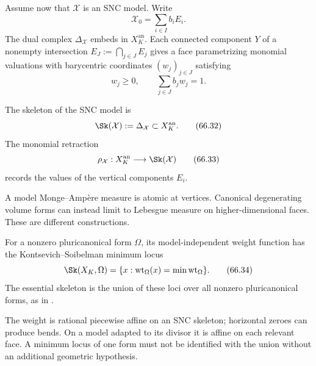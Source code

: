 Assume now that $\mathcal X$ is an SNC model. Write
\[
                         \mathcal X_0=\sum_{i\in I}b_iE_i.
\tag{66.30}\label{eq:hybrid-snc-fibre}
\]
The dual complex $\Delta_{\mathcal X}$ embeds in
$X_K^{\mathrm{an}}$. Each connected component $Y$ of a nonempty intersection
$E_J:=\bigcap_{j\in J}E_j$ gives a face parametrizing monomial valuations with barycentric coordinates $(w_j)_{j\in J}$ satisfying
\[
                         w_j\geq0,
             \qquad \sum_{j\in J}b_jw_j=1.
\tag{66.31}\label{eq:hybrid-simplex}
\]

\begin{definition}
\label{def:hybrid-skeleton}
The skeleton of the SNC model is
\[
                     \Sk(\mathcal X):=\Delta_{\mathcal X}
                     \subset X_K^{\mathrm{an}}.
\tag{66.32}\label{eq:hybrid-skeleton}
\]
The monomial retraction
\[
               \rho_{\mathcal X}:X_K^{\mathrm{an}}
                    \longrightarrow\Sk(\mathcal X)
\tag{66.33}\label{eq:hybrid-retraction}
\]
records the values of the vertical components $E_i$.
\end{definition}

A model Monge--Amp\`ere measure is atomic at vertices. Canonical
degenerating volume forms can instead limit to Lebesgue measure on
higher-dimensional faces. These are different constructions.

\begin{definition}
\label{def:hybrid-essential-skeleton}
For a nonzero pluricanonical form $\Omega$, its model-independent weight function has the Kontsevich--Soibelman minimum locus
\[
 \Sk(X_K,\Omega)=\{x:\mathrm{wt}_\Omega(x)=\min\mathrm{wt}_\Omega\}.
\tag{66.34}\label{eq:hybrid-essential-skeleton}
\]
The essential skeleton is the union of these loci over all nonzero pluricanonical forms, as in .
\end{definition}

The weight is rational piecewise affine on an SNC skeleton; horizontal
zeroes can produce bends. On a model adapted to its divisor it is affine
on each relevant face. A minimum locus of one form must not be identified
with the union without an additional geometric hypothesis.

